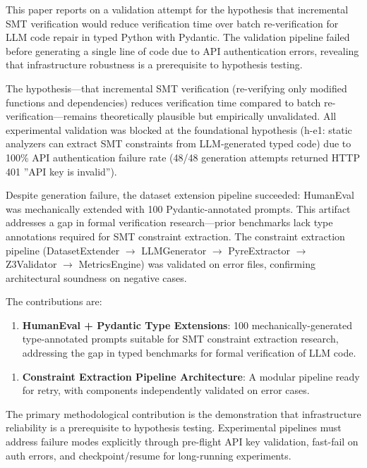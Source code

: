 
This paper reports on a validation attempt for the hypothesis that incremental SMT verification would reduce verification time over batch re-verification for LLM code repair in typed Python with Pydantic. The validation pipeline failed before generating a single line of code due to API authentication errors, revealing that infrastructure robustness is a prerequisite to hypothesis testing.

The hypothesis---that incremental SMT verification (re-verifying only modified functions and dependencies) reduces verification time compared to batch re-verification---remains theoretically plausible but empirically unvalidated. All experimental validation was blocked at the foundational hypothesis (h-e1: static analyzers can extract SMT constraints from LLM-generated typed code) due to 100\% API authentication failure rate (48/48 generation attempts returned HTTP 401 ''API key is invalid'').

Despite generation failure, the dataset extension pipeline succeeded: HumanEval was mechanically extended with 100 Pydantic-annotated prompts. This artifact addresses a gap in formal verification research---prior benchmarks lack type annotations required for SMT constraint extraction. The constraint extraction pipeline (DatasetExtender $\rightarrow$ LLMGenerator $\rightarrow$ PyreExtractor $\rightarrow$ Z3Validator $\rightarrow$ MetricsEngine) was validated on error files, confirming architectural soundness on negative cases.

The contributions are:

\begin{enumerate}
\item \textbf{HumanEval + Pydantic Type Extensions}: 100 mechanically-generated type-annotated prompts suitable for SMT constraint extraction research, addressing the gap in typed benchmarks for formal verification of LLM code.
\end{enumerate}

\begin{enumerate}
\item \textbf{Constraint Extraction Pipeline Architecture}: A modular pipeline ready for retry, with components independently validated on error cases.
\end{enumerate}

The primary methodological contribution is the demonstration that infrastructure reliability is a prerequisite to hypothesis testing. Experimental pipelines must address failure modes explicitly through pre-flight API key validation, fast-fail on auth errors, and checkpoint/resume for long-running experiments.

